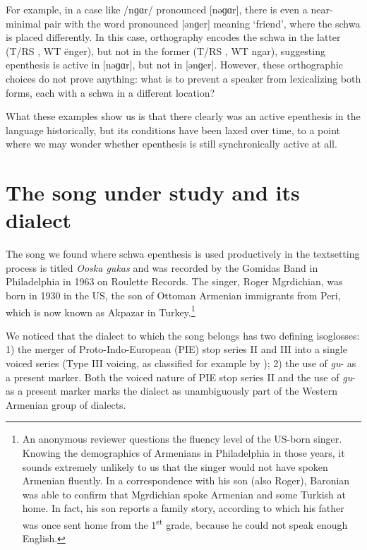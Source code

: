 \documentclass[output=paper,colorlinks,citecolor=brown]{langscibook}
\begin{document}
For example, in a case like /nɡɑr/ pronounced [nəɡɑr], there is even a near-minimal pair with the word pronounced [ənɡer] meaning ‘friend’, where the schwa is placed differently.  In this case, orthography encodes the schwa in the latter (T/RS , WT ënger), but not in the former (T/RS , WT ngar), suggesting epenthesis is active in [nəɡɑr], but not in [ənɡer].  However, these orthographic choices do not prove anything: what is to prevent a speaker from lexicalizing both forms, each with a schwa in a different location?

What these examples show us is that there clearly was an active epenthesis in the language historically, but its conditions have been laxed over time, to a point where we may wonder whether epenthesis is still synchronically active at all.

\section{The song under study and its dialect}
The song we found where schwa epenthesis is used productively in the textsetting process is titled \textit{Ooska gukas} and was recorded by the Gomidas Band in Philadelphia in 1963 on Roulette Records.  The singer, Roger Mgrdichian, was born in 1930 in the US, the son of Ottoman Armenian immigrants from Peri, which is now known as Akpazar in Turkey.\footnote{An anonymous reviewer questions the fluency level of the US-born singer.  Knowing the demographics of Armenians in Philadelphia in those years, it sounds extremely unlikely to us that the singer would not have spoken Armenian fluently.  In a correspondence with his son (also Roger), Baronian was able to confirm that Mgrdichian spoke Armenian and some Turkish at home.  In fact, his son reports a family story, according to which his father was once sent home from the 1\textsuperscript{st} grade, because he could not speak enough English.}

We noticed that the dialect to which the song belongs has two defining isoglosses: 1) the merger of Proto-Indo-European (PIE) stop series II and III into a single voiced series (Type III voicing, as classified for example by \cite{Pisowicz1976}); 2) the use of \textit{gu}- as a present marker.  Both the voiced nature of PIE stop series II and the use of \textit{gu}- as a present marker marks the dialect as unambiguously part of the Western Armenian group of dialects.
\end{document}
